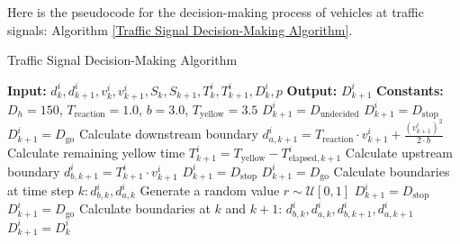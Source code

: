 Here is the pseudocode for the decision-making process of vehicles at traffic signals: Algorithm \ref{Traffic Signal Decision-Making Algorithm}.
\begin{algorithm}[htp]
\caption{Traffic Signal Decision-Making Algorithm}\label{Traffic Signal Decision-Making Algorithm}
\begin{algorithmic}[1]  %
    \State \textbf{Input:} $d_k^i, d_{k+1}^i, v_k^i, v_{k+1}^i, S_k, S_{k+1}, T_k^i, T_{k+1}^i, D_k^i, p$
    \State \textbf{Output:} $D_{k+1}^i$
    \State \textbf{Constants:} $D_h = 150$, $T_{\text{reaction}} = 1.0$, $b = 3.0$, $T_{\text{yellow}} = 3.5$
            \State $D_{k+1}^i = D_{\text{undecided}}$
        \Else
                    \State $D_{k+1}^i = D_{\text{stop}}$
                \EndIf
                    \State $D_{k+1}^i = D_{\text{go}}$
                \EndIf
                \State Calculate downstream boundary $d_{a, k+1}^i = T_{\text{reaction}} \cdot v_{k+1}^i + \frac{(v_{k+1}^i)^2}{2 \cdot b}$
                \State Calculate remaining yellow time $T_{k+1}^i = T_{\text{yellow}} -T_{\text{elapsed}, {k+1}}^i$
                \State Calculate upstream boundary $d_{b, k+1}^i = T_{k+1}^i \cdot v_{k+1}^i$
                    \State $D_{k+1}^i = D_{\text{stop}}$
                    \State $D_{k+1}^i = D_{\text{go}}$
                \State Calculate boundaries at time step $k: d_{b, k}^i, d_{a, k}^i$
                        \State Generate a random value $r \sim \mathcal{U}[0, 1]$
                            \State $D_{k+1}^i = D_{\text{stop}}$
                        \Else
                            \State $D_{k+1}^i = D_{\text{go}}$
                        \EndIf
                    \EndIf
                \EndIf
            \EndIf
        \EndIf
            \State Calculate boundaries at $k$ and $k+1$: $d_{b, k}^i, d_{a, k}^i, d_{b, k+1}^i, d_{a, k+1}^i$
                \State $D_{k+1}^i = D_k^i$ 
            \EndIf
        \EndIf
    \EndFor
\end{algorithmic}
\end{algorithm}






